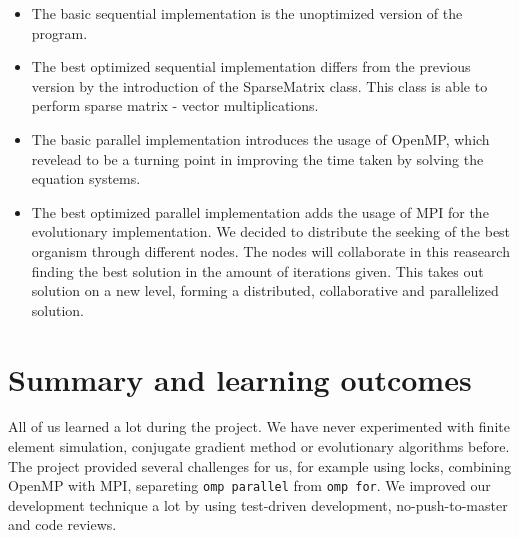 \documentclass[12pt]{article}
\begin{document}
\begin{itemize}
    \item The basic sequential implementation is the unoptimized version of the program.
    \item The best optimized sequential implementation differs from the previous version by the introduction of the SparseMatrix class. This class is able to perform sparse matrix - vector multiplications.
    \item The basic parallel implementation introduces the usage of OpenMP, which revelead to be a turning point in improving the time taken by solving the equation systems.
    \item The best optimized parallel implementation adds the usage of MPI for the evolutionary implementation. We decided to distribute the seeking of the best organism through different nodes. The nodes will collaborate in this reasearch finding the best solution in the amount of iterations given. This takes out solution on a new level, forming a distributed, collaborative and parallelized solution.
\end{itemize}

\section{Summary and learning outcomes}
All of us learned a lot during the project. We have never experimented with finite element simulation, conjugate gradient method or evolutionary algorithms before. The project provided several challenges for us, for example using locks, combining OpenMP with MPI, separeting \texttt{omp parallel} from \texttt{omp for}. We improved our development technique a lot by using test-driven development, no-push-to-master and code reviews.



\end{document}
